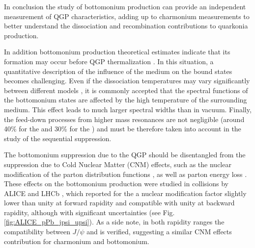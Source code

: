In conclusion the study of bottomonium production can provide an independent measurement of QGP characteristics, adding up to charmonium measurements to better understand the dissociation and recombination contributions to quarkonia production.

In addition bottomonium production theoretical estimates \cite{Krouppa:2015yoa} indicate that its formation may occur before QGP thermalization \cite{Mauricio:2007vz}. 
In this situation, a quantitative description of the influence of the medium on the bound states becomes challenging.
Even if the dissociation temperatures may vary significantly between different models \cite{Brambilla:2010cs,Andronic:2015wma}, it is commonly accepted \cite{Burnier:2014ssa} that the spectral functions of the bottomonium states are affected by the high temperature of the surrounding medium.
This effect leads to much larger spectral widths than in vacuum.
Finally, the feed-down processes from higher mass resonances are not negligible (around 40\% for the \upsis and 30\% for the \upsiss \cite{Andronic:2015wma}) and must be therefore taken into account in the study of the sequential suppression.

The bottomonium suppression due to the QGP should be disentangled from the suppression due to Cold Nuclear Matter (CNM) effects, such as the nuclear modification of the parton distribution functions \cite{Eskola:1998df,Eskola:2009uj}, as well as parton energy loss \cite{Arleo:2012rs}.
These effects on the bottomonium production were studied in \ppb collisions by ALICE \cite{Abelev:2014oea} and LHCb \cite{Aaij:2014mza}, which reported for the \upsis a nuclear modification factor slightly lower than unity at forward rapidity and compatible with unity at backward rapidity, although with significant uncertainties (see Fig. \ref{fig:ALICE_pPb_jpsi_upsi}).
As a side note, in both rapidity ranges the compatibility between $J/\psi$ and \upsis is verified, suggesting a similar CNM effects contribution for charmonium and bottomonium.

